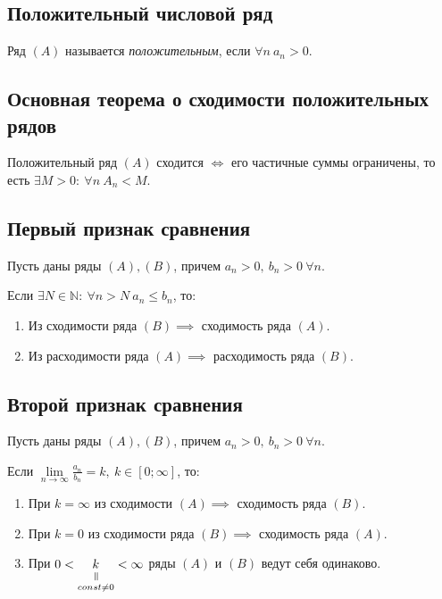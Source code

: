 \subsection{Положительный числовой ряд}

\begin{definition}
    Ряд $ (A) $ называется \emph{положительным}, если $ \forall n \ a_n>0 $.
\end{definition}

\subsection{Основная теорема о сходимости положительных рядов}

\begin{theorem}\label{theorem:2.1}
    Положительный ряд $ (A) $ сходится $ \iff $ его частичные суммы ограничены, то есть $ \exists M > 0: \ \forall n \ A_n < M $.
\end{theorem}

\subsection{Первый признак сравнения}

\begin{theorem}\label{theorem:6.2}
    Пусть даны ряды $ (A),(B) $, причем $a_n > 0, \ b_n > 0 \ \forall n$.

    Если $\exists N \in \mathbb{N}: \ \forall n > N \ a_n \leqslant b_n$, то:
    \begin{enumerate}
        \item Из сходимости ряда $(B) \implies$ сходимость ряда $(A)$.
        \item Из расходимости ряда $(A) \implies$ расходимость ряда $(B)$.
    \end{enumerate}
\end{theorem}

\subsection{Второй признак сравнения}

\begin{theorem}
    Пусть даны ряды $ (A),(B) $, причем $a_n > 0, \ b_n > 0 \ \forall n$.

    Если $\underset{n\rightarrow\infty}{\lim}\frac{a_n}{b_n}=k, \ k\in [0;\infty]$, то:
    \begin{enumerate}
        \item При $k=\infty$ из сходимости $(A) \implies$ сходимость ряда $(B)$.
        \item При $k=0$ из сходимости ряда $(B) \implies$ сходимость ряда $(A)$.
        \item При $0<\equalto{k}{const \ne 0}<\infty$ ряды $(A)$ и $(B)$ ведут себя одинаково.
    \end{enumerate}
\end{theorem}

